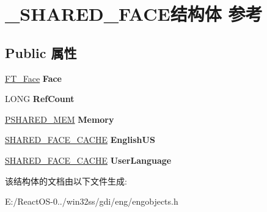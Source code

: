 \hypertarget{struct___s_h_a_r_e_d___f_a_c_e}{}\section{\+\_\+\+S\+H\+A\+R\+E\+D\+\_\+\+F\+A\+C\+E结构体 参考}
\label{struct___s_h_a_r_e_d___f_a_c_e}
\subsection*{Public 属性}
\begin{DoxyCompactItemize}
\item 
\mbox{\label{struct___s_h_a_r_e_d___f_a_c_e_a212abf1fb143d8edeb8f2bc34e54c184}} 
\hyperlink{struct_f_t___face_rec__}{F\+T\+\_\+\+Face} {\bfseries Face}
\item 
\mbox{\label{struct___s_h_a_r_e_d___f_a_c_e_a484b02927824c31ae4a8a280f96860d8}} 
L\+O\+NG {\bfseries Ref\+Count}
\item 
\mbox{\label{struct___s_h_a_r_e_d___f_a_c_e_a744a93b7fd42c05db8c7eee28bfc02f6}} 
\hyperlink{struct___s_h_a_r_e_d___m_e_m}{P\+S\+H\+A\+R\+E\+D\+\_\+\+M\+EM} {\bfseries Memory}
\item 
\mbox{\label{struct___s_h_a_r_e_d___f_a_c_e_adc3301b6884f184de59f29d6c0933c13}} 
\hyperlink{struct___s_h_a_r_e_d___f_a_c_e___c_a_c_h_e}{S\+H\+A\+R\+E\+D\+\_\+\+F\+A\+C\+E\+\_\+\+C\+A\+C\+HE} {\bfseries English\+US}
\item 
\mbox{\label{struct___s_h_a_r_e_d___f_a_c_e_abf633cd532f63701175f5b70a517d625}} 
\hyperlink{struct___s_h_a_r_e_d___f_a_c_e___c_a_c_h_e}{S\+H\+A\+R\+E\+D\+\_\+\+F\+A\+C\+E\+\_\+\+C\+A\+C\+HE} {\bfseries User\+Language}
\end{DoxyCompactItemize}


该结构体的文档由以下文件生成\+:\begin{DoxyCompactItemize}
\item 
E\+:/\+React\+O\+S-\/0../win32ss/gdi/eng/engobjects.\+h\end{DoxyCompactItemize}
